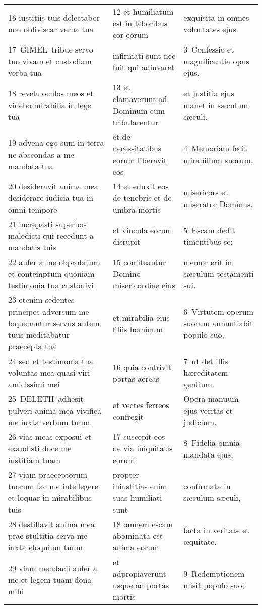 \documentclass{article}
\begin{document}
\begin{longtable}{@{}p{}p{}p{}@{}}
16 iustitiis tuis delectabor non obliviscar verba tua	&	12 et humiliatum est in laboribus cor eorum	&	exquisita in omnes voluntates ejus.	\\
17 GIMEL tribue servo tuo vivam et custodiam verba tua	&	infirmati sunt nec fuit qui adiuvaret	&	3 Confessio et magnificentia opus ejus,	\\
18 revela oculos meos et videbo mirabilia in lege tua	&	13 et clamaverunt ad Dominum cum tribularentur	&	et justitia ejus manet in sæculum sæculi.	\\
19 advena ego sum in terra ne abscondas a me mandata tua	&	et de necessitatibus eorum liberavit eos	&	4 Memoriam fecit mirabilium suorum,	\\
20 desideravit anima mea desiderare iudicia tua in omni tempore	&	14 et eduxit eos de tenebris et de umbra mortis	&	misericors et miserator Dominus.	\\
21 increpasti superbos maledicti qui recedunt a mandatis tuis	&	et vincula eorum disrupit	&	5 Escam dedit timentibus se;	\\
22 aufer a me obprobrium et contemptum quoniam testimonia tua custodivi	&	15 confiteantur Domino misericordiae eius	&	memor erit in sæculum testamenti sui.	\\
23 etenim sedentes principes adversum me loquebantur servus autem tuus meditabatur praecepta tua	&	et mirabilia eius filiis hominum	&	6 Virtutem operum suorum annuntiabit populo suo,	\\
24 sed et testimonia tua voluntas mea quasi viri amicissimi mei	&	16 quia contrivit portas aereas	&	7 ut det illis hæreditatem gentium.	\\
25 DELETH adhesit pulveri anima mea vivifica me iuxta verbum tuum	&	et vectes ferreos confregit	&	Opera manuum ejus veritas et judicium.	\\
26 vias meas exposui et exaudisti doce me iustitiam tuam	&	17 suscepit eos de via iniquitatis eorum	&	8 Fidelia omnia mandata ejus,	\\
27 viam praeceptorum tuorum fac me intellegere et loquar in mirabilibus tuis	&	propter iniustitias enim suas humiliati sunt	&	confirmata in sæculum sæculi,	\\
28 destillavit anima mea prae stultitia serva me iuxta eloquium tuum	&	18 omnem escam abominata est anima eorum	&	facta in veritate et æquitate.	\\
29 viam mendacii aufer a me et legem tuam dona mihi	&	et adpropiaverunt usque ad portas mortis	&	9 Redemptionem misit populo suo;	\\

\end{longtable}
\end{document}
